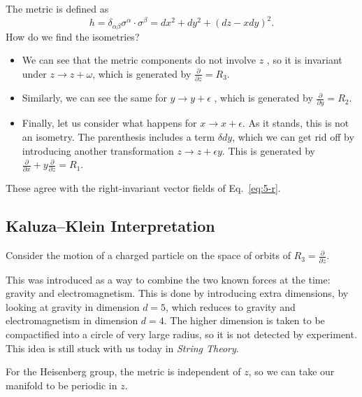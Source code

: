\begin{example}[Nil]
  The metric is defined as
  \begin{equation}
    h = \delta_{\alpha\beta} \sigma^{\alpha} \cdot \sigma^{\beta} = dx^2 + dy^2 + (dz - x dy)^2.
  \end{equation}
  How do we find the isometries?
  \begin{itemize}
    \item We can see that the metric components do not involve $z$ , so it is invariant under $z \to z + \omega$, which is generated by  $\frac{\partial }{\partial z} = R_3$.

    \item Similarly, we can see the same for  $y \to y + \epsilon$ , which is generated by $\frac{\partial}{\partial y} = R_2$.

    \item Finally, let us consider what happens for $x \to x + \epsilon$. As it stands, this is not an isometry. The parenthesis includes a term $\delta dy$, which we can get rid off by introducing another transformation $z \to z + \epsilon y$.
      This is generated by $\frac{\partial}{\partial x} + y \frac{\partial }{\partial z} = R_1$.
  \end{itemize}
  These agree with the right-invariant vector fields of Eq.~\eqref{eq:5-r}.
\end{example}

\subsection{Kaluza--Klein Interpretation}%
\label{sub:kaluza_klein_interpretation}

Consider the motion of a charged particle on the space of orbits of $R_3 = \frac{\partial }{\partial z}$.

\begin{leftbar}
  This was introduced as a way to combine the two known forces at the time: gravity and electromagnetism.
  This is done by introducing extra dimensions, by looking at gravity in dimension $d = 5$, which reduces to gravity and electromagnetism in dimension  $d=4$.
  The higher dimension is taken to be compactified into a circle of very large radius, so it is not detected by experiment. This idea is still stuck with us today in  \emph{String Theory}.
  \begin{example}[]
    For the Heisenberg group, the metric is independent of $z$, so we can take our manifold to be periodic in $z$.
  \end{example}
\end{leftbar}

